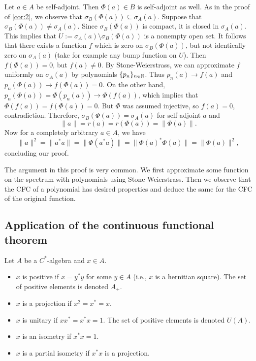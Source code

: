 \begin{myproof}
    Let $a \in A$ be self-adjoint. Then $\Phi (a) \in B$ is self-adjoint as well.
    As in the proof of \ref{cor:2}, we observe that $\sigma_B (\Phi (a)) \subseteq \sigma_A (a)$.
    Suppose that $\sigma_B (\Phi (a)) \neq \sigma_A (a)$.
    Since $\sigma_B (\Phi (a))$ is compact, it is closed in $\sigma_A (a)$. This implies that $U := \sigma_A (a) \setminus \sigma_B (\Phi (a))$
    is a nonempty open set. It follows that there exists a function $f$ which is zero on $\sigma_B (\Phi (a))$, but not identically zero on $\sigma_A (a)$
    (take for example any bump function on $U$). Then $f(\Phi(a)) = 0$, but $f(a) \neq 0$. By Stone-Weierstrass,
    we can approximate $f$ uniformly on $\sigma_A (a)$ by polynomials $\{ p_n \}_{n \in \mathbb {N}}$.
    Thus $p_n (a) \to f(a)$ and $p_n (\Phi (a)) \to f(\Phi (a)) = 0$.
    On the other hand, $ p_n (\Phi(a)) = \Phi (p_n (a)) \to \Phi (f(a))$,
    which implies that $\Phi (f(a)) = f(\Phi(a)) = 0.$
    But $\Phi$ was assumed injective, so $f(a) = 0$, contradiction.
    Therefore, $\sigma_B (\Phi (a)) = \sigma_A (a)$ for self-adjoint $a$ and
    $$\| a\| = r(a) = r(\Phi(a)) = \| \Phi(a)\|.$$
    Now for a completely arbitrary $a \in A$, we have 
    $$\| a\|^2 = \| a^* a\| = \| \Phi(a^* a)\| = \| \Phi(a)^* \Phi(a)\| = \| \Phi(a)\|^2,$$
    concluding our proof.
\end{myproof}

The argument in this proof is very common. We first approximate some function on the spectrum with polynomials 
    using Stone-Weierstrass. Then we observe that the CFC of a polynomial has desired properties 
    and deduce the same for the CFC of the original function.

\subsection{Application of the continuous functional theorem}

\begin{definition}
  Let $A$ be a $C^*$-algebra and $x \in A$.
  \begin{itemize}
    \item $x$ is positive if $x = y^* y$ for some $y \in A$ (i.e., $x$ is a hernitian square). The set of positive elements is denoted $A_+$.
    \item $x$ is a projection if $x^2 = x^* = x$.
    \item $x$ is unitary if $x x^* = x^* x = 1$. The set of positive elements is denoted $U(A)$.
    \item $x$ is an isometry if $x^* x = 1$.
    \item $x$ is a partial isometry if $x^* x$ is a projection.
  \end{itemize}
\end{definition}

